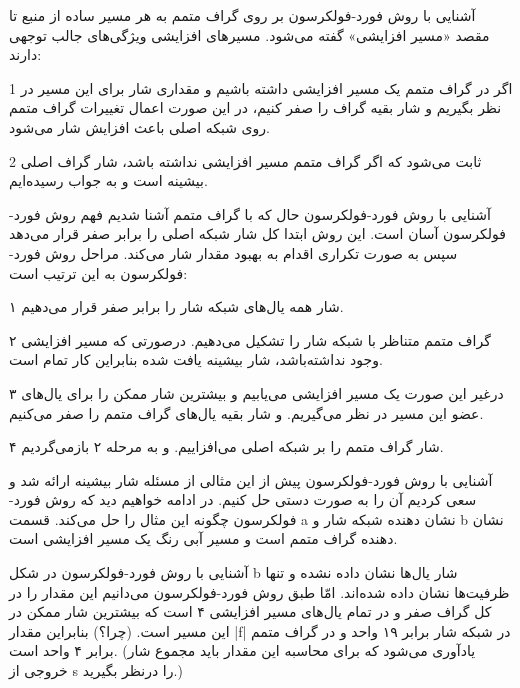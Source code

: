 \begin{itemframe}{آشنایی با روش فورد-فولکرسون}
\itm
بر روی گراف متمم به هر مسیر ساده از منبع تا مقصد «مسیر افزایشی»
گفته می‌شود.
\itm
مسیر‌های افزایشی ویژگی‌های جالب توجهی دارند:
\item[1]
اگر در گراف متمم یک مسیر افزایشی داشته باشیم و مقداری شار برای این مسیر در نظر بگیریم و شار بقیه گراف را صفر کنیم، در این صورت اعمال تغییرات گراف متمم روی شبکه اصلی باعث افزایش شار می‌شود.
\item[2]
ثابت می‌شود که اگر گراف متمم مسیر افزایشی نداشته باشد، شار گراف اصلی بیشینه است و به جواب رسیده‌ایم.
\end{itemframe}



\begin{itemframe}{آشنایی با روش فورد-فولکرسون}
\itm
حال که با گراف متمم آشنا شدیم فهم روش فورد-فولکرسون آسان است. این روش ابتدا کل شار شبکه اصلی را برابر صفر قرار می‌دهد سپس به صورت تکراری اقدام به بهبود مقدار شار می‌کند. مراحل روش فورد-فولکرسون به این ترتیب است:
\item[۱]
شار همه یال‌های شبکه شار را برابر صفر قرار می‌دهیم.
\item[۲]
گراف متمم متناظر با شبکه شار را تشکیل می‌دهیم. درصورتی که مسیر افزایشی وجود نداشته‌باشد، شار بیشینه یافت شده بنابراین کار تمام است.
\item[۳]
درغیر این صورت یک مسیر افزایشی می‌یابیم و بیشترین شار ممکن را برای یال‌های عضو این مسیر در نظر می‌گیریم. و شار بقیه یال‌های گراف متمم را صفر می‌کنیم.
\item[۴]
شار گراف متمم را بر شبکه اصلی می‌افزاییم. و به مرحله ۲ بازمی‌گردیم.

\end{itemframe}


\begin{itemframe}{آشنایی با روش فورد-فولکرسون}
\itm
پیش از این مثالی از مسئله شار بیشینه ارائه شد و سعی کردیم آن را به صورت دستی حل کنیم. در ادامه خواهیم دید که روش فورد-فولکرسون چگونه این مثال را حل می‌کند.
\itm
قسمت a نشان دهنده شبکه شار و b نشان دهنده گراف متمم است و مسیر آبی رنگ یک مسیر افزایشی است.
\end{itemframe}


\begin{itemframe}{آشنایی با روش فورد-فولکرسون}
\itm
در شکل b شار یال‌ها نشان داده نشده و تنها ظرفیت‌ها نشان داده شده‌اند. امّا طبق روش فورد-فولکرسون می‌دانیم این مقدار را در کل گراف صفر و در تمام یال‌های مسیر افزایشی ۴ است که بیشترین شار ممکن در این مسیر است. (چرا؟)
\itm
بنابراین مقدار |f| در شبکه شار برابر ۱۹ واحد و در گراف متمم برابر ۴ واحد است. (يادآوری می‌شود که برای محاسبه این مقدار باید مجموع شار خروجی از s را درنظر بگیرید.)
\end{itemframe}


